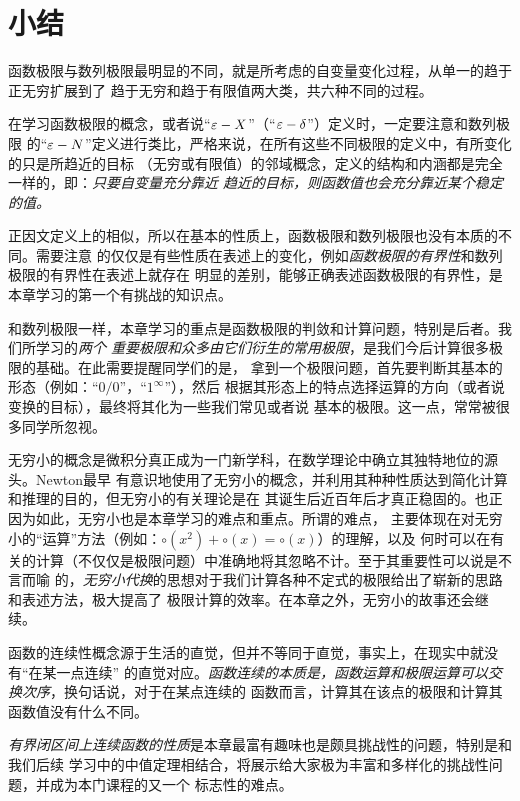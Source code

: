 \section{小结}

函数极限与数列极限最明显的不同，就是所考虑的自变量变化过程，从单一的趋于正无穷扩展到了
趋于无穷和趋于有限值两大类，共六种不同的过程。

在学习函数极限的概念，或者说“$\varepsilon-X$”（“$\varepsilon-\delta$”）定义时，一定要注意和数列极限
的“$\varepsilon-N$”定义进行类比，严格来说，在所有这些不同极限的定义中，有所变化的只是所趋近的目标
（无穷或有限值）的邻域概念，定义的结构和内涵都是完全一样的，即：{\it 只要自变量充分靠近
趋近的目标，则函数值也会充分靠近某个稳定的值。}

正因文定义上的相似，所以在基本的性质上，函数极限和数列极限也没有本质的不同。需要注意
的仅仅是有些性质在表述上的变化，例如{\it 函数极限的有界性}和数列极限的有界性在表述上就存在
明显的差别，能够正确表述函数极限的有界性，是本章学习的第一个有挑战的知识点。

和数列极限一样，本章学习的重点是函数极限的判敛和计算问题，特别是后者。我们所学习的{\it 两个
重要极限和众多由它们衍生的常用极限}，是我们今后计算很多极限的基础。在此需要提醒同学们的是，
拿到一个极限问题，首先要判断其基本的形态（例如：“$0/0$”，“$1^{\infty}$”），然后
根据其形态上的特点选择运算的方向（或者说变换的目标），最终将其化为一些我们常见或者说
基本的极限。这一点，常常被很多同学所忽视。

无穷小的概念是微积分真正成为一门新学科，在数学理论中确立其独特地位的源头。Newton最早
有意识地使用了无穷小的概念，并利用其种种性质达到简化计算和推理的目的，但无穷小的有关理论是在
其诞生后近百年后才真正稳固的。也正因为如此，无穷小也是本章学习的难点和重点。所谓的难点，
主要体现在对无穷小的“运算”方法（例如：$\circ(x^2)+\circ(x)=\circ(x)$）的理解，以及
何时可以在有关的计算（不仅仅是极限问题）中准确地将其忽略不计。至于其重要性可以说是不言而喻
的，{\it 无穷小代换}的思想对于我们计算各种不定式的极限给出了崭新的思路和表述方法，极大提高了
极限计算的效率。在本章之外，无穷小的故事还会继续。

函数的连续性概念源于生活的直觉，但并不等同于直觉，事实上，在现实中就没有“在某一点连续”
的直觉对应。{\it 函数连续的本质是，函数运算和极限运算可以交换次序}，换句话说，对于在某点连续的
函数而言，计算其在该点的极限和计算其函数值没有什么不同。

{\it 有界闭区间上连续函数的性质}是本章最富有趣味也是颇具挑战性的问题，特别是和我们后续
学习中的中值定理相结合，将展示给大家极为丰富和多样化的挑战性问题，并成为本门课程的又一个
标志性的难点。


